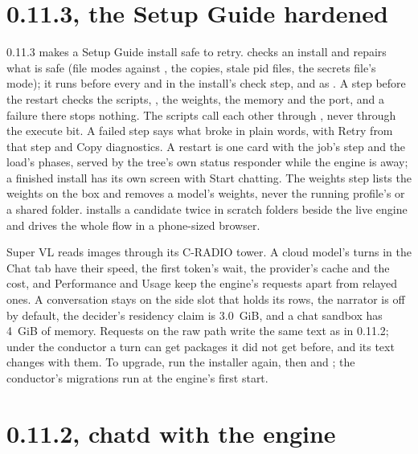 \section{0.11.3, the Setup Guide hardened}\label{sec:changelog-0113}

0.11.3 makes a Setup Guide install safe to retry.  checks an install and repairs what is safe (file modes against , the  copies, stale pid files, the secrets file's mode); it runs before every  and in the install's check step, and as . A step before the restart checks the scripts, , the weights, the memory and the port, and a failure there stops nothing. The scripts call each other through , never through the execute bit. A failed step says what broke in plain words, with Retry from that step and Copy diagnostics. A restart is one card with the job's step and the load's phases, served by the tree's own status responder while the engine is away; a finished install has its own screen with Start chatting. The weights step lists the weights on the box and removes a model's weights, never the running profile's or a shared folder.  installs a candidate twice in scratch folders beside the live engine and drives the whole flow in a phone-sized browser.

Super VL reads images through its C-RADIO tower. A cloud model's turns in the Chat tab have their speed, the first token's wait, the provider's cache and the cost, and Performance and Usage keep the engine's requests apart from relayed ones. A conversation stays on the side slot that holds its rows, the narrator is off by default, the decider's residency claim is 3.0~GiB, and a chat sandbox has 4~GiB of memory. Requests on the raw path write the same text as in 0.11.2; under the conductor a turn can get packages it did not get before, and its text changes with them. To upgrade, run the installer again, then  and ; the conductor's migrations run at the engine's first start.

\section{0.11.2, chatd with the engine}\label{sec:changelog-0112}

